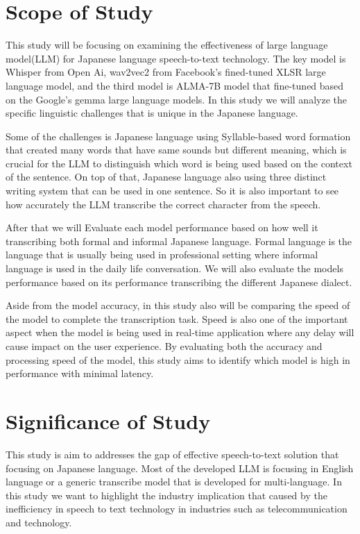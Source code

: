 \section{Scope of Study}
This study will be focusing on examining the effectiveness of large language model(LLM) for Japanese language speech-to-text technology. The key model is Whisper from Open Ai, wav2vec2 from Facebook's fined-tuned XLSR large language model, and the third model is ALMA-7B model that fine-tuned based on the Google's gemma large language models. In this study we will analyze the specific linguistic challenges that is unique in the Japanese language. 

Some of the challenges is Japanese language using Syllable-based word formation that created many words that have same sounds but different meaning, which is crucial for the LLM to distinguish which word is being used based on the context of the sentence. On top of that, Japanese language also using three distinct writing system that can be used in one sentence. So it is also important to see how accurately the LLM transcribe the correct character from the speech. 

After that we will Evaluate each model performance based on how well it  transcribing both formal and informal Japanese language. Formal language is the language that is usually being used in professional setting where informal language is used in the daily life conversation. We will also evaluate the models performance based on its performance transcribing the different Japanese dialect. 

Aside from the model accuracy, in this study also will be comparing the speed of the model to complete the transcription task. Speed is also one of the important aspect when the model is being used in real-time application where any delay will cause impact on the user experience. By evaluating both the accuracy and processing speed of the model, this study aims to identify which model is high in performance with minimal latency.  


\section{Significance of Study}
This study is aim to addresses the gap of effective speech-to-text solution that focusing on Japanese language. Most of the developed LLM is focusing in English language or a generic transcribe model that is developed for multi-language. In this study we want to highlight the industry implication that caused by the inefficiency in speech to text technology in industries such as telecommunication and technology. 

